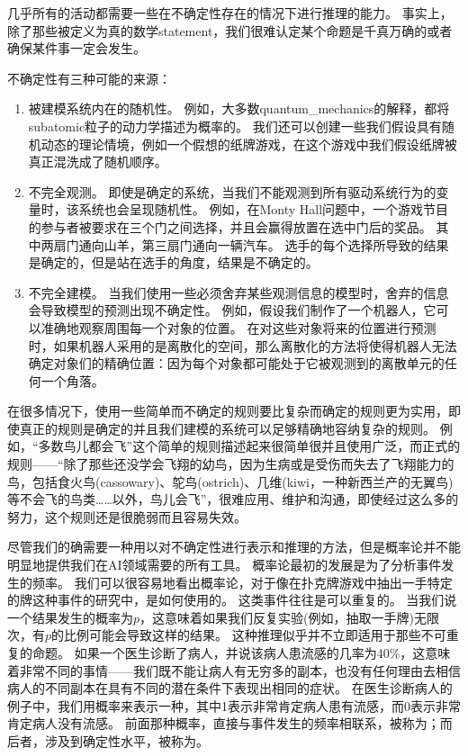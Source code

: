 几乎所有的活动都需要一些在不确定性存在的情况下进行推理的能力。
事实上，除了那些被定义为真的数学\gls{statement}，我们很难认定某个命题是千真万确的或者确保某件事一定会发生。

不确定性有三种可能的来源：

\begin{enumerate}
\item 被建模系统内在的随机性。
例如，大多数\gls{quantum_mechanics}的解释，都将\gls{subatomic}粒子的动力学描述为概率的。
我们还可以创建一些我们假设具有随机动态的理论情境，例如一个假想的纸牌游戏，在这个游戏中我们假设纸牌被真正混洗成了随机顺序。

\item 不完全观测。
即使是确定的系统，当我们不能观测到所有驱动系统行为的变量时，该系统也会呈现随机性。
例如，在Monty Hall问题中，一个游戏节目的参与者被要求在三个门之间选择，并且会赢得放置在选中门后的奖品。
其中两扇门通向山羊，第三扇门通向一辆汽车。
选手的每个选择所导致的结果是确定的，但是站在选手的角度，结果是不确定的。

\item 不完全建模。
当我们使用一些必须舍弃某些观测信息的模型时，舍弃的信息会导致模型的预测出现不确定性。
例如，假设我们制作了一个机器人，它可以准确地观察周围每一个对象的位置。
在对这些对象将来的位置进行预测时，如果机器人采用的是离散化的空间，那么离散化的方法将使得机器人无法确定对象们的精确位置：因为每个对象都可能处于它被观测到的离散单元的任何一个角落。
\end{enumerate}


在很多情况下，使用一些简单而不确定的规则要比复杂而确定的规则更为实用，即使真正的规则是确定的并且我们建模的系统可以足够精确地容纳复杂的规则。
例如，``多数鸟儿都会飞''这个简单的规则描述起来很简单很并且使用广泛，而正式的规则——``除了那些还没学会飞翔的幼鸟，因为生病或是受伤而失去了飞翔能力的鸟，包括食火鸟(cassowary)、鸵鸟(ostrich)、几维(kiwi，一种新西兰产的无翼鸟)等不会飞的鸟类……以外，鸟儿会飞''，很难应用、维护和沟通，即使经过这么多的努力，这个规则还是很脆弱而且容易失效。

尽管我们的确需要一种用以对不确定性进行表示和推理的方法，但是概率论并不能明显地提供我们在\gls{AI}领域需要的所有工具。
概率论最初的发展是为了分析事件发生的频率。
我们可以很容易地看出概率论，对于像在扑克牌游戏中抽出一手特定的牌这种事件的研究中，是如何使用的。
这类事件往往是可以重复的。
当我们说一个结果发生的概率为$p$，这意味着如果我们反复实验(例如，抽取一手牌)无限次，有$p$的比例可能会导致这样的结果。
这种推理似乎并不立即适用于那些不可重复的命题。
如果一个医生诊断了病人，并说该病人患流感的几率为40\%，这意味着非常不同的事情——我们既不能让病人有无穷多的副本，也没有任何理由去相信病人的不同副本在具有不同的潜在条件下表现出相同的症状。
在医生诊断病人的例子中，我们用概率来表示一种，其中1表示非常肯定病人患有流感，而0表示非常肯定病人没有流感。
前面那种概率，直接与事件发生的频率相联系，被称为；而后者，涉及到确定性水平，被称为。

